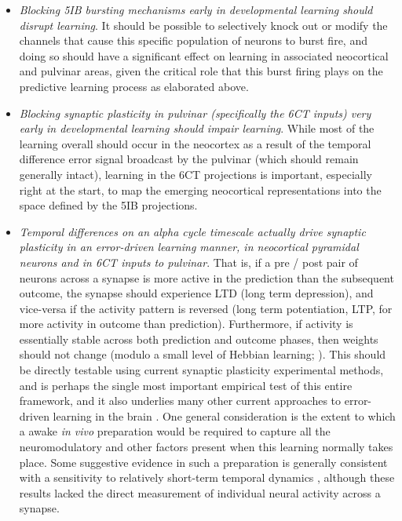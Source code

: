 \documentclass[11pt,twoside]{article}
\newif\myifpdf
\begin{document}
\begin{itemize}
	\item \emph{Blocking 5IB bursting mechanisms early in developmental learning should disrupt learning}.  It should be possible to selectively knock out or modify the channels that cause this specific population of neurons to burst fire, and doing so should have a significant effect on learning in associated neocortical and pulvinar areas, given the critical role that this burst firing plays on the predictive learning process as elaborated above.

	\item \emph{Blocking synaptic plasticity in pulvinar (specifically the 6CT inputs) very early in developmental learning should impair learning}.  While most of the learning overall should occur in the neocortex as a result of the temporal difference error signal broadcast by the pulvinar (which should remain generally intact), learning in the 6CT projections is important, especially right at the start, to map the emerging neocortical representations into the space defined by the 5IB projections.
	
	\item \emph{Temporal differences on an alpha cycle timescale actually drive synaptic plasticity in an error-driven learning manner, in neocortical pyramidal neurons and in 6CT inputs to pulvinar}.  That is, if a pre / post pair of neurons across a synapse is more active in the prediction than the subsequent outcome, the synapse should experience LTD (long term depression), and vice-versa if the activity pattern is reversed (long term potentiation, LTP, for more activity in outcome than prediction).  Furthermore, if activity is essentially stable across both prediction and outcome phases, then weights should not change (modulo a small level of Hebbian learning; \citealp{OReillyMunakata00,OReillyMunakataFrankEtAl12}).  This should be directly testable using current synaptic plasticity experimental methods, and is perhaps the single most important empirical test of this entire framework, and it also underlies many other current approaches to error-driven learning in the brain \citep{BengioMesnardFischerEtAl17,WhittingtonBogacz19,LillicrapSantoroMarrisEtAl20}.  One general consideration is the extent to which a awake \emph{in vivo} preparation would be required to capture all the neuromodulatory and other factors present when this learning normally takes place.  Some suggestive evidence in such a preparation is generally consistent with a sensitivity to relatively short-term temporal dynamics \citep{LimMcKeeWoloszynEtAl15}, although these results lacked the direct measurement of individual neural activity across a synapse.

\end{itemize}
\end{document}
